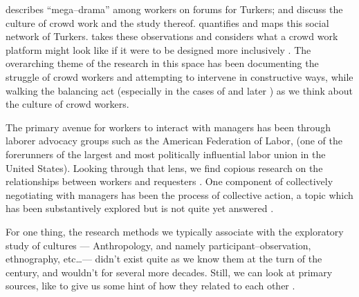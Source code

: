 \documentclass[trackingWork]{subfiles}
\begin{document}
\citeauthor{dynamo} describes ``mega--drama'' among workers on forums for Turkers;
\citeauthor{irani2015cultural} and \citeauthor{storiesIraniSilberman} discuss
the culture of crowd work and the study thereof.
\citeauthor{crowdcollab} quantifies and maps this social network of Turkers.
\citeauthor{takingAHITMcInnis} takes these observations and considers
what a crowd work platform might look like if it were to be designed more inclusively
\cite{dynamo,irani2015cultural,storiesIraniSilberman,crowdcollab,takingAHITMcInnis}.
The overarching theme of the research in this space has been
documenting the struggle of crowd workers
and attempting to intervene in constructive ways, while walking the balancing act
(especially in the cases of \citeauthor{irani2015cultural} and later \citeauthor{storiesIraniSilberman})
as we think about the culture of crowd workers.



\subsubsubsection{\pieceworkpers}
The primary avenue for workers to interact with managers has been through
laborer advocacy groups such as the American Federation of Labor,
(one of the forerunners of the largest and
most politically influential labor union in the United States).
Looking through that lens, we find copious research on
the relationships between workers and requesters
\cite{levi2009union,ahlquist2013interest,
      mccallum2013global,jacoby1983union}.
One component of collectively negotiating with managers has been the process
of collective action, a topic which has been substantively explored
but is not quite yet answered
\cite{russell1982collective,olsonlogic}.


For one thing, the research methods we typically associate with the exploratory study of cultures
--- Anthropology, and namely participant--observation, ethnography, etc\dots ---
didn't exist quite as we know them at the turn of the  century, and
wouldn't for several more decades.
Still, we can look at primary sources, like 
to give us some hint of how they related to each other
\cite{american1921problem}.
\end{document}
